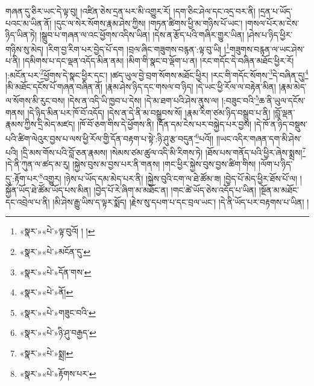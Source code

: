 གཞན་དུ་ཅིར་ཡང་དེ་ལྟ་བུ། །འཛིན་ཅེས་དྲན་པར་མི་འགྱུར་རོ། །དག་ཅིང་ཤེལ་དང་འདྲ་བར་ནི། །དྲན་པ་ཡོད་པའང་མ་ཡིན་ནོ། །དུང་ལ་སེར་སོགས་རྣམ་ཤེས་ཀྱིས། །གཏན་ཚིགས་ཕྱི་མ་གཉིས་པོ་ཡང་། །གསལ་པོར་མ་ངེས་ཉིད་ཡིན་ཏེ། །སྒྲུབ་པ་གཞན་ལ་འང་ཕྱོགས་འདིས་ཡིན། །དེས་ན་རྩོད་པའི་གཞིར་གྱུར་ཡིན། །ཤེས་པ་ཉིད་ཕྱིར་གཉིས་སུ་མེད། །རིག་བྱ་རིག་པར་བྱེད་པོ་དག །བྲལ་ཞིང་གཟུགས་བརྙན་:ལྟ་བུ་ཡི། །\footnote{«སྣར་»«པེ་»ལྟ་བུའོ། ། །}གཟུགས་བརྙན་ལ་ཡང་ཤེས་པ་ནི། །དམིགས་པ་དང་ལྡན་འདོད་མིན་ནམ། །མིག་གི་སྣང་བ་ལྡོག་པ་ན། །རང་གདོང་དེ་བཞིན་མཐོང་ཕྱིར་རོ། །:མངོན་པར་\footnote{«སྣར་»«པེ་»མངོན་དུ་}ཕྱོགས་དེ་སྣང་ཕྱིར་དང་། །ཚད་ཡུལ་བྱེ་བྲག་སོགས་མཐོང་ཕྱིར། །རང་གི་གདོང་སོགས་\footnote{«སྣར་»«པེ་»དོན་གས་}དེ་བཞིན་དུ།\footnote{«སྣར་»«པེ་»ནོ།} །མི་མཐོང་དངོས་པོ་གཞན་བཞིན་ནོ། །རྣམ་ཤེས་ཉིད་དང་གསལ་བ་ཉིད། །དེ་ཡང་ཕྱི་རོལ་ལ་བརྟེན་མིན། །རྣམ་མེད་ལ་སོགས་མི་རུང་བས། །དེས་ན་འདི་ཡི་ཁྱབ་པ་དེས། །དེ་མ་ཐག་པའི་ཤེས་ནུས་ལ། །:བཟུང་བའི་\footnote{«སྣར་»«པེ་»གཟུང་བའི་}ཆ་ནི་ཡུལ་དངོས་གནས། །དེ་ཉིད་མིན་པར་ཁོ་བོ་འདོད། །དེས་ན་དེ་ནི་མ་བསྒྲུབས་སོ། །རྣམ་རིག་ཙམ་ཉིད་བསྒྲུབ་པ་ནི། །བློ་ལྡན་རྣམས་ཀྱིས་དྲི་མེད་མཛད། །ཁོ་བོ་ཅག་གིས་དེ་ཕྱོགས་ནི། །དོན་དམ་ངེས་པར་བསྐྱེད་པར་བྱས། །དེ་ཁོ་ན་ཉིད་བསྡུས་པའི་ཚིག་ལེའུར་བྱས་པ་ལས་ཕྱི་རོལ་གྱི་དོན་བརྟག་པ་སྟེ་:ཉི་ཤུ་རྩ་བདུན་\footnote{«སྣར་»«པེ་»ཉི་ཤུ་བརྒྱད་}པའོ།། །།ཡང་འདིར་གཞན་དག་མི་ཤེས་པའི། །དྲི་མས་གོས་པའི་བློ་ཅན་རྣམས། །སེམས་ཙམ་ཚུལ་འདི་མི་རིགས་ཏེ། །ཐོས་པས་གནོད་པའི་ཕྱིར་ཞེས་སྨྲས།\footnote{«སྣར་»«པེ་»སྨྲ།} །དེ་ནི་ཀུན་ལ་ཚད་མ་རུ། །སྐྱེས་བུས་མ་བྱས་པར་ནི་གནས། །གང་ཕྱིར་སྐྱེས་བུས་བྱས་ཚིག་གིས། །ལོག་པ་ཉིད་དུ་:རྟོག་པར་\footnote{«སྣར་»«པེ་»རྟོགས་པར་}འགྱུར། །ཉེས་པ་ཡོད་དམ་མེད་པར་ནི། །སྐྱེས་བུའི་ངག་ལ་ཐེ་ཚོམ་ཟ། །བྱེད་པོ་མེད་ཕྱིར་ཐོས་པོ་ལ། །སྐྱོན་ཡོད་ཐེ་ཚོམ་ཡོད་པས་མིན། །བྱེད་པོ་རེ་ཞིག་མ་མཐོང་ན། །གང་ཚེ་ཡོད་ཅེས་འདོད་པ་ཡིན། །སྔོན་མ་མཐོང་དང་འབྲེལ་པ་ནི། །མི་ཤེས་རྒྱུ་ཡིས་ད་ལྟར་སྨོད། །རྗེས་སུ་དཔག་པ་དང་བྲལ་ཡང་། །དེ་ནི་ཡོད་པར་བརྟགས་པ་ཡིན། །
